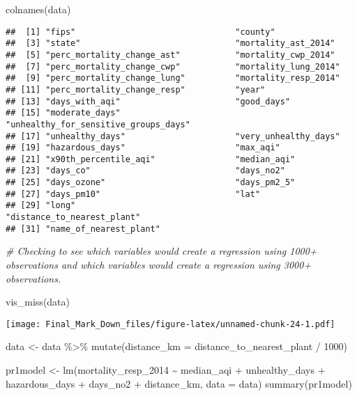 \documentclass[
]{article}
\newenvironment{Shaded}{\begin{snugshade}}{\end{snugshade}}
\newcommand{\AttributeTok}[1]{\textcolor[rgb]{0.77,0.63,0.00}{#1}}
\newcommand{\CommentTok}[1]{\textcolor[rgb]{0.56,0.35,0.01}{\textit{#1}}}
\newcommand{\DecValTok}[1]{\textcolor[rgb]{0.00,0.00,0.81}{#1}}
\newcommand{\FunctionTok}[1]{\textcolor[rgb]{0.00,0.00,0.00}{#1}}
\newcommand{\NormalTok}[1]{#1}
\newcommand{\OtherTok}[1]{\textcolor[rgb]{0.56,0.35,0.01}{#1}}
\newcommand{\SpecialCharTok}[1]{\textcolor[rgb]{0.00,0.00,0.00}{#1}}
\begin{document}
\begin{Shaded}
\begin{Highlighting}[]
\FunctionTok{colnames}\NormalTok{(data)}
\end{Highlighting}
\end{Shaded}

\begin{verbatim}
##  [1] "fips"                                "county"                             
##  [3] "state"                               "mortality_ast_2014"                 
##  [5] "perc_mortality_change_ast"           "mortality_cwp_2014"                 
##  [7] "perc_mortality_change_cwp"           "mortality_lung_2014"                
##  [9] "perc_mortality_change_lung"          "mortality_resp_2014"                
## [11] "perc_mortality_change_resp"          "year"                               
## [13] "days_with_aqi"                       "good_days"                          
## [15] "moderate_days"                       "unhealthy_for_sensitive_groups_days"
## [17] "unhealthy_days"                      "very_unhealthy_days"                
## [19] "hazardous_days"                      "max_aqi"                            
## [21] "x90th_percentile_aqi"                "median_aqi"                         
## [23] "days_co"                             "days_no2"                           
## [25] "days_ozone"                          "days_pm2_5"                         
## [27] "days_pm10"                           "lat"                                
## [29] "long"                                "distance_to_nearest_plant"          
## [31] "name_of_nearest_plant"
\end{verbatim}

\begin{Shaded}
\begin{Highlighting}[]
\CommentTok{\# Checking to see which variables would create a regression using 1000+ observations and which variables would create a regression using 3000+ observations. }

\FunctionTok{vis\_miss}\NormalTok{(data)}
\end{Highlighting}
\end{Shaded}

\texttt{[image: Final\_Mark\_Down\_files/figure-latex/unnamed-chunk-24-1.pdf]}

\begin{Shaded}
\begin{Highlighting}[]
\NormalTok{data }\OtherTok{\textless{}{-}}\NormalTok{ data }\SpecialCharTok{\%\textgreater{}\%} 
  \FunctionTok{mutate}\NormalTok{(}\AttributeTok{distance\_km =}\NormalTok{ distance\_to\_nearest\_plant }\SpecialCharTok{/} \DecValTok{1000}\NormalTok{)}

\NormalTok{pr1model }\OtherTok{\textless{}{-}} \FunctionTok{lm}\NormalTok{(mortality\_resp\_2014 }\SpecialCharTok{\textasciitilde{}}\NormalTok{ median\_aqi }\SpecialCharTok{+}\NormalTok{ unhealthy\_days }\SpecialCharTok{+}\NormalTok{ hazardous\_days }\SpecialCharTok{+}\NormalTok{ days\_no2 }\SpecialCharTok{+}\NormalTok{ distance\_km, }\AttributeTok{data =}\NormalTok{ data)}
\FunctionTok{summary}\NormalTok{(pr1model)}
\end{Highlighting}
\end{Shaded}
\end{document}
